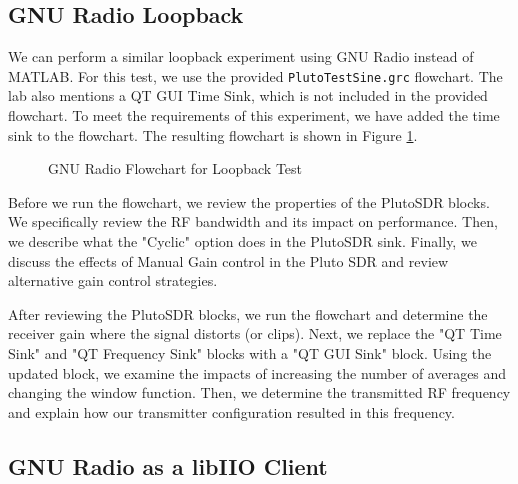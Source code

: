 \documentclass{article}
\begin{document}
\subsection{GNU Radio Loopback}
\label{section::gnu_radio_loopback}

We can perform a similar loopback experiment using GNU Radio instead of MATLAB. For this test, we use the provided \texttt{PlutoTestSine.grc} flowchart. The lab also mentions a QT GUI Time Sink, which is not included in the provided flowchart. To meet the requirements of this experiment, we have added the time sink to the flowchart. The resulting flowchart is shown in Figure \ref{fig::gnu_radio_loopback_flowchart0}.

\begin{figure}[H]
	\centerline{}
	\caption{GNU Radio Flowchart for Loopback Test}
	\label{fig::gnu_radio_loopback_flowchart0}
\end{figure}

Before we run the flowchart, we review the properties of the PlutoSDR blocks. We specifically review the RF bandwidth and its impact on performance. Then, we describe what the "Cyclic" option does in the PlutoSDR sink. Finally, we discuss the effects of Manual Gain control in the Pluto SDR and review alternative gain control strategies.

After reviewing the PlutoSDR blocks, we run the flowchart and determine the receiver gain where the signal distorts (or clips). Next, we replace the "QT Time Sink" and "QT Frequency Sink" blocks with a "QT GUI Sink" block. Using the updated block, we examine the impacts of increasing the number of averages and changing the window function. Then, we determine the transmitted RF frequency and explain how our transmitter configuration resulted in this frequency.

\subsection{GNU Radio as a libIIO Client}
\end{document}

